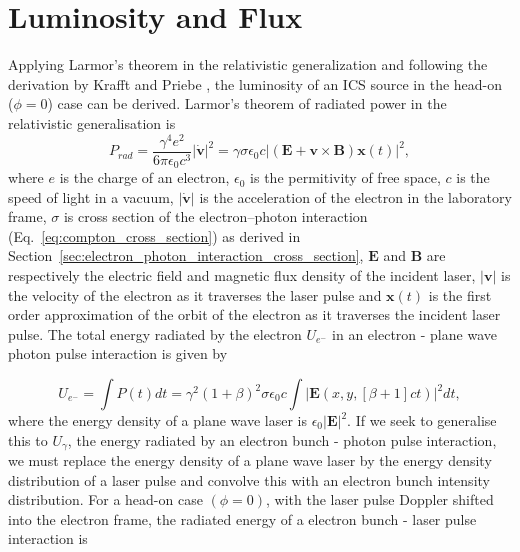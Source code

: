 \documentclass[../main.tex]{subfiles}
\begin{document}
\section{Luminosity and Flux}
\label{sec:luminosity_and_flux}

Applying Larmor's theorem \cite{larmor1897lxiii,purcell1965electricity} in the relativistic generalization \cite{jackson1999classical} and following the derivation by Krafft and Priebe \cite{krafft2010compton}, the luminosity of an ICS source in the head-on ($\phi=0$) case can be derived. Larmor's theorem of radiated power in the relativistic generalisation is 
\begin{equation}
P_{rad} = \frac{\gamma^{4}e^{2}}{6\pi \epsilon_{0}c^{3}}\lvert\mathbf{\dot{v}}\rvert^{2} = \gamma\sigma\epsilon_{0}c\lvert\left(\mathbf{E}+\mathbf{v}\times\mathbf{B}\right)\mathbf{x}\left(t\right)\rvert^{2},
\label{eq:larmor_formula}    
\end{equation}
where $e$ is the charge of an electron,  $\epsilon_{0}$ is the permitivity of free space, $c$ is the speed of light in a vacuum, $\lvert\mathbf{\dot{v}}\rvert$ is the acceleration of the electron in the laboratory frame, $\sigma$ is cross section of the electron--photon interaction (Eq.~\ref{eq:compton_cross_section}) as derived in Section~\ref{sec:electron_photon_interaction_cross_section}, $\mathbf{E}$ and $\mathbf{B}$ are respectively the electric field and magnetic flux density of the incident laser, $\lvert\mathbf{v}\rvert$ is the velocity of the electron as it traverses the laser pulse and $\mathbf{x}\left(t\right)$ is the first order approximation of the orbit of the electron as it traverses the incident laser pulse. 
The total energy radiated by the electron $U_{e^{-}}$ in an electron - plane wave photon pulse interaction is given by \cite{krafft2010compton}

\begin{equation}
U_{e^{-}} = \int P\left(t\right)dt = \gamma^{2}\left(1+\beta\right)^{2}\sigma\epsilon_{0}c\int\lvert\mathbf{E}\left(x,y,\left[\beta+1\right]ct\right)\rvert^{2}dt,
\label{eq:electron_radiated_energy}
\end{equation}
where the energy density of a plane wave laser is $\epsilon_{0}\lvert\mathbf{E}\rvert^{2}$. If we seek to generalise this to $U_{\gamma}$, the energy radiated by an electron bunch - photon pulse interaction, we must replace the energy density of a plane wave laser by the energy density distribution of a laser pulse and convolve this with an electron bunch intensity distribution. For a head-on case $\left(\phi=0\right)$, with the laser pulse Doppler shifted into the electron frame, the radiated energy of a electron bunch - laser pulse interaction is    
\end{document}
